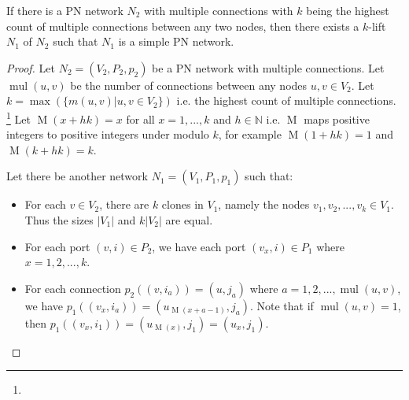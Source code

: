 \begin{theorem} \label{thm:lcl_nonsolvability:3}
    If there is a PN network $N_2$ with multiple connections with $k$ being the highest count of multiple connections between any two nodes, then there exists a $k$-lift $N_1$ of $N_2$ such that $N_1$ is a simple PN network.
\end{theorem}
\begin{proof}
    Let $N_2=(V_2, P_2, p_2)$ be a PN network with multiple connections.
    Let $\operatorname{mul}(u, v)$ be the number of connections between any nodes $u, v \in V_2$.
    Let $k=\max (\{ m(u, v) | u, v \in V_2\} )$ i.e. the highest count of multiple connections.
    \footnote{}
    Let $\operatorname{M}(x+hk) = x$ for all $x = 1, ..., k$ and $h\in \mathbb{N}$ i.e. $\operatorname{M}$ maps positive integers to positive integers under modulo $k$, for example $\operatorname{M}(1 + hk) = 1$ and $\operatorname{M}(k + hk) = k$.

    Let there be another network $N_1=(V_1, P_1, p_1)$ such that:
    \begin{itemize}
        \item For each $v \in V_2$, there are $k$ clones in $V_1$, namely the nodes $v_1, v_2, ..., v_k \in V_1$.
        Thus the sizes $|V_1|$ and $k|V_2|$ are equal.
        \item For each port $(v, i) \in P_2$, we have each port $(v_x, i) \in P_1$ where $x=1, 2, ..., k$.

        \item For each connection $p_2((v, i_a)) = (u, j_a)$ where $a = 1, 2, ..., \operatorname{mul}(u, v)$, we have $p_1((v_{x}, i_a)) = (u_{\operatorname{M}(x+a-1)}, j_a)$.
        Note that if $\operatorname{mul}(u, v) = 1$, then $p_1((v_{x}, i_1)) = (u_{\operatorname{M}(x)}, j_1) = (u_{x}, j_1)$.
    \end{itemize}


\end{proof}
